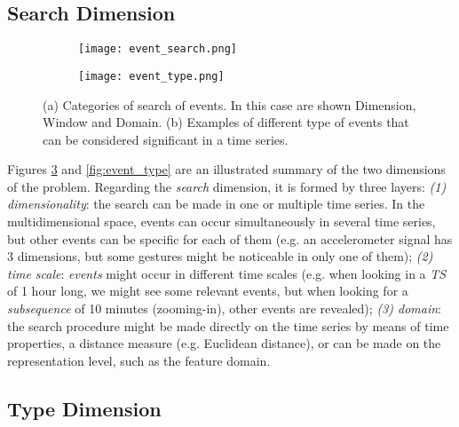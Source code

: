 \subsection{Search Dimension}

\begin{figure}
\begin{subfigure}{.5\textwidth}
	\centering
	\texttt{[image: event\_search.png]}
	\label{fig:event_search}
	\caption{}
\end{subfigure}%
\begin{subfigure}{.5\textwidth}
	\centering
	\texttt{[image: event\_type.png]}
	\label{fig:event_search}
	\caption{}
\end{subfigure}
\caption{(a) Categories of search of events. In this case are shown Dimension, Window and Domain. (b) Examples of different type of events that can be considered significant in a time series.}
\end{figure}

Figures \ref{fig:event_search} and \ref{fig:event_type} are an illustrated summary of the two dimensions of the problem. Regarding the \textit{search} dimension, it is formed by three layers: \textit{(1) dimensionality}: the search can be made in one or multiple time series. In the multidimensional space, events can occur simultaneously in several time series, but other events can be specific for each of them (e.g. an accelerometer signal has 3 dimensions, but some gestures might be noticeable in only one of them); \textit{(2) time scale}: \textit{events} might occur in different time scales (e.g. when looking in a \textit{TS} of 1 hour long, we might see some relevant events, but when looking for a \textit{subsequence} of 10 minutes (zooming-in), other events are revealed); \textit{(3) domain}: the search procedure might be made directly on the time series by means of time properties, a distance measure (e.g. Euclidean distance), or can be made on the representation level, such as the feature domain.

\subsection{Type Dimension}

